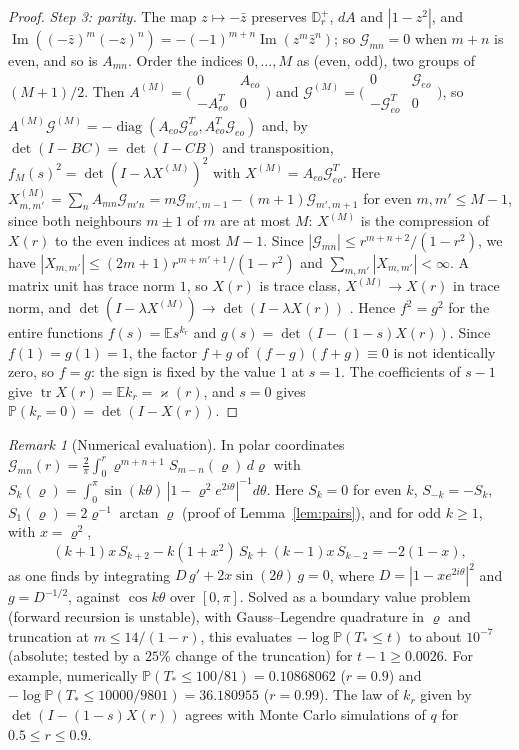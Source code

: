 \documentclass[11pt]{amsart}
\theoremstyle{definition}
\theoremstyle{remark}
\newtheorem{remark}[theorem]{Remark}
\numberwithin{equation}{section}
\newcommand{\D}{\mathbb{D}}
\newcommand{\E}{\mathbb{E}}
\newcommand{\PP}{\mathbb{P}}
\DeclareMathOperator{\im}{Im}
\begin{document}
\begin{proof}
\emph{Step 3: parity.} The map $z\mapsto-\bar z$ preserves $\D_r^+$, $dA$ and $|1-z^2|$, and $\im((-\bar z)^m(-z)^n)=-(-1)^{m+n}\im(z^m\bar z^n)$; so $\mathcal G_{mn}=0$ when $m+n$ is even, and so is $A_{mn}$. Order the indices $0,\dots,M$ as (even, odd), two groups of $(M+1)/2$. Then $A^{(M)}=\bigl(\begin{smallmatrix}0&A_{eo}\\-A_{eo}^T&0\end{smallmatrix}\bigr)$ and $\mathcal G^{(M)}=\bigl(\begin{smallmatrix}0&\mathcal G_{eo}\\-\mathcal G_{eo}^T&0\end{smallmatrix}\bigr)$, so $A^{(M)}\mathcal G^{(M)}=-\operatorname{diag}(A_{eo}\mathcal G_{eo}^T,A_{eo}^T\mathcal G_{eo})$ and, by $\det(I-BC)=\det(I-CB)$ and transposition, $f_M(s)^2=\det(I-\lambda X^{(M)})^2$ with $X^{(M)}=A_{eo}\mathcal G_{eo}^T$. Here $X^{(M)}_{m,m'}=\sum_nA_{mn}\mathcal G_{m'n}=m\mathcal G_{m',m-1}-(m+1)\mathcal G_{m',m+1}$ for even $m,m'\le M-1$, since both neighbours $m\pm1$ of $m$ are at most $M$: $X^{(M)}$ is the compression of $X(r)$ to the even indices at most $M-1$. Since $|\mathcal G_{mn}|\le r^{m+n+2}/(1-r^2)$, we have $|X_{m,m'}|\le(2m+1)r^{m+m'+1}/(1-r^2)$ and $\sum_{m,m'}|X_{m,m'}|<\infty$. A matrix unit has trace norm $1$, so $X(r)$ is trace class, $X^{(M)}\to X(r)$ in trace norm, and $\det(I-\lambda X^{(M)})\to\det(I-\lambda X(r))$ \cite[Lemmas~14.38 and~14.39]{vN}. Hence $f^2=g^2$ for the entire functions $f(s)=\E s^{k_r}$ and $g(s)=\det(I-(1-s)X(r))$. Since $f(1)=g(1)=1$, the factor $f+g$ of $(f-g)(f+g)\equiv0$ is not identically zero, so $f=g$: the sign is fixed by the value $1$ at $s=1$. The coefficients of $s-1$ give $\operatorname{tr}X(r)=\E k_r=\varkappa(r)$, and $s=0$ gives $\PP(k_r=0)=\det(I-X(r))$.
\end{proof}

\begin{remark}[Numerical evaluation]\label{rem:fredholm-num}
In polar coordinates $\mathcal G_{mn}(r)=\frac2\pi\int_0^r\varrho^{m+n+1}S_{m-n}(\varrho)\,d\varrho$ with $S_k(\varrho)=\int_0^\pi\sin(k\theta)\,|1-\varrho^2e^{2i\theta}|^{-1}d\theta$. Here $S_k=0$ for even $k$, $S_{-k}=-S_k$, $S_1(\varrho)=2\varrho^{-1}\arctan\varrho$ (proof of Lemma~\ref{lem:pairs}), and for odd $k\ge1$, with $x=\varrho^2$,
\[
(k+1)x\,S_{k+2}-k(1+x^2)\,S_k+(k-1)x\,S_{k-2}=-2(1-x),
\]
as one finds by integrating $D\,g'+2x\sin(2\theta)\,g=0$, where $D=|1-xe^{2i\theta}|^2$ and $g=D^{-1/2}$, against $\cos k\theta$ over $[0,\pi]$. Solved as a boundary value problem (forward recursion is unstable), with Gauss--Legendre quadrature in $\varrho$ and truncation at $m\le14/(1-r)$, this evaluates $-\log\PP(T_*\le t)$ to about $10^{-7}$ (absolute; tested by a $25\%$ change of the truncation) for $t-1\ge0.0026$. For example, numerically $\PP(T_*\le100/81)=0.10868062$ ($r=0.9$) and $-\log\PP(T_*\le10000/9801)=36.180955$ ($r=0.99$). The law of $k_r$ given by $\det(I-(1-s)X(r))$ agrees with Monte Carlo simulations of $q$ for $0.5\le r\le0.9$.
\end{remark}
\end{document}
